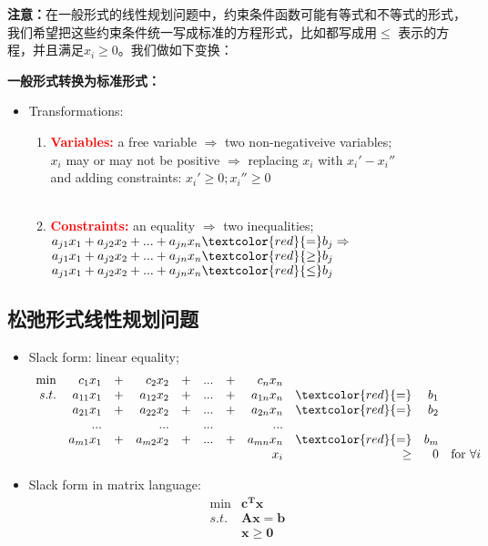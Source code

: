 \begin{itemize}
\end{itemize}

\textbf{注意：}在一般形式的线性规划问题中，约束条件函数可能有等式和不等式的形式，我们希望把这些约束条件统一写成标准的方程形式，比如都写成用$\leq$ 表示的方程，并且满足$x_{i} \geq 0 $。我们做如下变换：

\textbf{一般形式转换为标准形式：}
\begin{itemize}
\item  Transformations:
\begin{enumerate}
\item \textcolor{red}{\bf Variables:}  a free variable $\Rightarrow$  two non-negativeive variables; \\
$x_i$ may or may not be positive  $\Rightarrow$  replacing $x_i$ with $x_i' - x_i''$ \\
     and adding constraints: $x_i' \geq 0 ; x_i'' \geq 0$
\ \\
\ \\
 \item \textcolor{red}{\bf Constraints:}  an equality $\Rightarrow$ two inequalities; \\
 $a_{j1}x_1 + a_{j2}x_2 + ... + a_{jn}x_n  \textcolor{red}{=}  b_j \Rightarrow $\\
$a_{j1}x_1 + a_{j2}x_2 + ... + a_{jn}x_n  \textcolor{red}{\geq} b_j $\\
$a_{j1}x_1 + a_{j2}x_2 + ... + a_{jn}x_n  \textcolor{red}{\leq} b_j $
\end{enumerate}
\end{itemize}

\subsection{松弛形式线性规划问题}
\begin{itemize}
\item
Slack form: linear equality;
\[
\begin{array}{rrrrrrrrrrrrl}
 \min & c_1x_1    &+&  c_2x_2   &+&  ...&+& c_nx_n    &      &    & \\
 s.t. & a_{11}x_1 &+& a_{12}x_2 &+& ... &+& a_{1n}x_n & \textcolor{red}{=} & b_1 &  \\
      & a_{21}x_1 &+& a_{22}x_2 &+& ... &+& a_{2n}x_n & \textcolor{red}{=} & b_2 &  \\
      &  ... & &   ... & & ... & &  ...  &      &     &  \\
      & a_{m1}x_1 &+& a_{m2}x_2 &+& ... &+& a_{mn}x_n & \textcolor{red}{=} & b_m &  \\
      &           & &           & &     & &       x_i & \geq & 0   & \text{for } \forall i
     \end{array} \nonumber
\]
\item
Slack form in matrix language:
\[
\begin{array}{rrrrrrrrrrrrl}
 \min & \mathbf{c^Tx}   \\
 s.t. & \mathbf{Ax = b} \\
      & \mathbf{x \geq 0} \\
\end{array} \nonumber
\]
\end{itemize}

